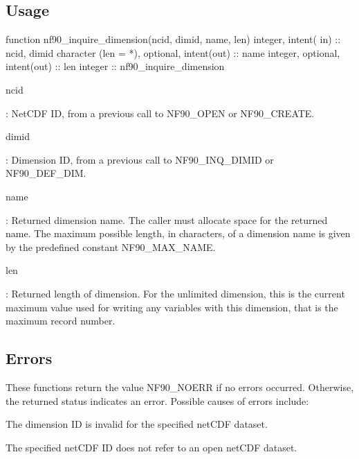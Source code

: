 \subsection*{Usage}


\begin{DoxyCode}
\textcolor{keyword}{function }nf90\_inquire\_dimension(ncid, dimid, name, len)
  \textcolor{keywordtype}{integer},                       \textcolor{keywordtype}{intent( in)} :: ncid, dimid
  \textcolor{keywordtype}{character (len = *)}, \textcolor{keywordtype}{optional}, \textcolor{keywordtype}{intent(out)} :: name
  \textcolor{keywordtype}{integer},             \textcolor{keywordtype}{optional}, \textcolor{keywordtype}{intent(out)} :: len
  \textcolor{keywordtype}{integer}                                    :: nf90\_inquire\_dimension
\end{DoxyCode}


{\ttfamily ncid}

\+: Net\+C\+DF ID, from a previous call to N\+F90\+\_\+\+O\+P\+EN or N\+F90\+\_\+\+C\+R\+E\+A\+TE.

{\ttfamily dimid}

\+: Dimension ID, from a previous call to N\+F90\+\_\+\+I\+N\+Q\+\_\+\+D\+I\+M\+ID or N\+F90\+\_\+\+D\+E\+F\+\_\+\+D\+IM.

{\ttfamily name}

\+: Returned dimension name. The caller must allocate space for the returned name. The maximum possible length, in characters, of a dimension name is given by the predefined constant N\+F90\+\_\+\+M\+A\+X\+\_\+\+N\+A\+ME.

{\ttfamily len}

\+: Returned length of dimension. For the unlimited dimension, this is the current maximum value used for writing any variables with this dimension, that is the maximum record number.

\subsection*{Errors}

These functions return the value N\+F90\+\_\+\+N\+O\+E\+RR if no errors occurred. Otherwise, the returned status indicates an error. Possible causes of errors include\+:


\begin{DoxyItemize}
\item The dimension ID is invalid for the specified net\+C\+DF dataset.
\item The specified net\+C\+DF ID does not refer to an open net\+C\+DF dataset.
\end{DoxyItemize}

